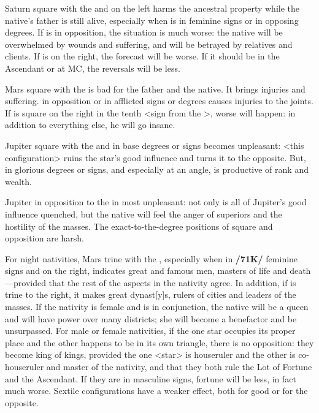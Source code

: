 Saturn \marginnote{\Saturn \Square \Sun} square with the \Sun\xspace and on the left harms the ancestral property while the native’s father is still alive, especially when \Saturn\xspace is in feminine signs or in opposing degrees. If \Saturn\xspace is in opposition, the situation is much worse: the native will be overwhelmed by wounds and suffering, and will be betrayed by relatives and clients. If \Saturn\xspace is on the right, the forecast will be worse. If it should be in the Ascendant or at MC, the reversals will be less.

Mars \marginnote{\Mars \Square \Sun} square with the \Sun\xspace is bad for the father and the native. It brings injuries and suffering. \Mars\xspace in opposition or in afflicted signs or degrees causes injuries to the joints. If \Mars\xspace is square on the right in the tenth <sign from the \Sun>, worse will happen: in addition to everything else, he will go insane.

Jupiter \marginnote{\Jupiter \Square \Sun} square with the \Sun\xspace and in base degrees or signs becomes unpleasant: <this configuration> ruins the star’s good influence and turns it to the opposite. But, \Jupiter\xspace in glorious degrees or signs, and especially at an angle, is productive of rank and wealth. 

Jupiter \marginnote{\Jupiter \Opposition \Sun} in opposition to the \Sun\xspace in most unpleasant: not only is all of Jupiter’s good influence quenched, but the native will feel the anger of superiors and the hostility of the masses. The \mndl exact-to-the-degree positions of square and opposition are
harsh.

For night nativities, Mars \marginnote{\Mars \Trine \Sun} trine with the \Sun, especially when in \textbf{/71K/} feminine signs and on the right, indicates great and famous men, masters of life and death—provided that the rest of the aspects in the nativity agree. In addition, if \Jupiter\xspace is trine to the right, it makes great dynast[y]s, rulers of cities and leaders of the masses. If the nativity is female and \Venus\xspace is in conjunction, the native will be a queen and will have power over many districts; she will become a benefactor and be unsurpassed. For male or female nativities, if the one star occupies its proper place and the other happens to be in its own triangle, there is
no opposition: they become king of kings, provided the one <star> is houseruler and the other is co-houseruler and master of the nativity, and that they both rule the Lot of Fortune and the Ascendant. If they are in masculine signs, fortune will be less, in fact much worse.  Sextile \mndl configurations have a weaker effect, both for good or for the opposite.

